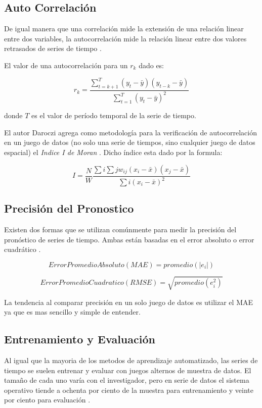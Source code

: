 \documentclass[letterpaper, spanish, 11pt]{report}
\begin{document}
\subsection{Auto Correlación}
De igual manera que una correlación mide la extensión de una relación linear entre dos variables, la autocorrelación mide la relación linear entre dos valores retrasados de series de tiempo \cite{hyndman}.

El valor de una autocorrelación para un \(r_{k}\) dado es:

\[ r_{k} = \frac{\sum_{t = k + 1}^T(y_{t} - \bar{y})(y_{t - k} - \bar{y})}{\sum_{t = 1}^T(y_{t} - \bar{y})^{2}} \]

donde \(T\) es el valor de período temporal de la serie de tiempo. 

El autor Daroczi agrega como metodología para la verificación de autocorrelación en un juego de datos (no solo una serie de tiempos, sino cualquier juego de datos espacial) el \emph{Indice I de Moran} \cite{daroczi}. Dicho índice esta dado por la formula:

\[ I = \frac{N}{W} 
	\frac{\sum{i}\sum{j}w_{ij}(x_{i} - \bar{x})(x_{j} - \bar{x})}{{\sum{i}(x_{i} - \bar{x})^2}} \]

\subsection{Precisión del Pronostico}
Existen dos formas que se utilizan comúnmente para medir la precisión del pronóstico de series de tiempo. Ambas están basadas en el error absoluto o error cuadrático \cite{hyndman}.

\[Error Promedio Absoluto (MAE) = promedio(|e_{i}|)\]

\[ Error Promedio Cuadratico (RMSE) = \sqrt{promedio(e_{i}^2)}  \]

La tendencia al comparar precisión en un solo juego de datos es utilizar el MAE ya que es mas sencillo y simple de entender. 

\subsection{Entrenamiento y Evaluación}
Al igual que la mayoria de los metodos de aprendizaje automatizado, las series de tiempo se suelen entrenar y evaluar con juegos alternos de muestra de datos. El tamaño de cada uno varía con el investigador, pero en serie de datos el sistema operativo tiende a ochenta por ciento de la muestra para entrenamiento y veinte por ciento para evaluación \cite{hyndman}.
\end{document}
